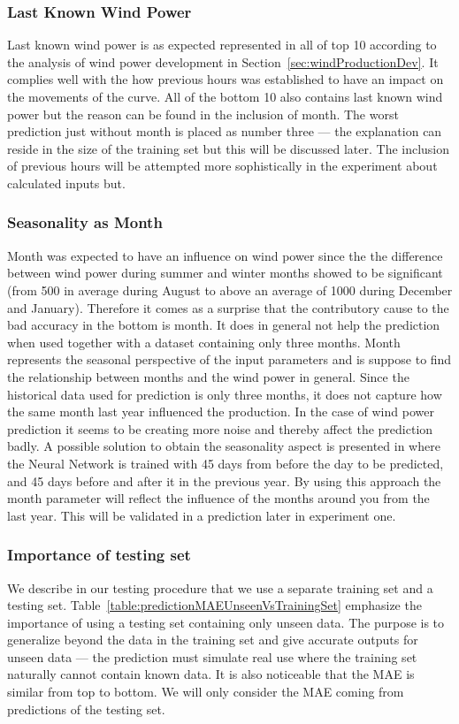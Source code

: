\subsubsection{Last Known Wind Power}
Last known wind power is as expected represented in all of top 10 according to the analysis of wind power development in Section~\ref{sec:windProductionDev}. It complies well with the how previous hours was established to have an impact on the movements of the curve. All of the bottom 10 also contains last known wind power but the reason can be found in the inclusion of month. The worst prediction just without month is placed as number three --- the explanation can reside in the size of the training set but this will be discussed later. The inclusion of previous hours will be attempted more sophistically in the experiment about calculated inputs but.

\subsubsection{Seasonality as Month}
Month was expected to have an influence on wind power since the the difference between wind power during summer and winter months showed to be significant (from 500 in average during August to above an average of 1000 during December and January). Therefore it comes as a surprise that the contributory cause to the bad accuracy in the bottom is month. It does in general not help the prediction when used together with a dataset containing only three months. Month represents the seasonal perspective of the input parameters and is suppose to find the relationship between months and the wind power in general. Since the historical data used for prediction is only three months, it does not capture how the same month last year influenced the production. In the case of wind power prediction it seems to be creating more noise and thereby affect the prediction badly. A possible solution to obtain the seasonality aspect is presented in\cite{pjmForecast} where the Neural Network is trained with 45 days from before the day to be predicted, and 45 days before and after it in the previous year. By using this approach the month parameter will reflect the influence of the months around you from the last year. This will be validated in a prediction later in experiment one.

\subsubsection{Importance of testing set}
We describe in our testing procedure that we use a separate training set and a testing set. Table~\ref{table:predictionMAEUnseenVsTrainingSet} emphasize the importance of using a testing set containing only unseen data. The purpose is to generalize beyond the data in the training set and give accurate outputs for unseen data \cite{1} --- the prediction must simulate real use where the training set naturally cannot contain known data. It is also noticeable that the MAE is similar from top to bottom. We will only consider the MAE coming from predictions of the testing set.


